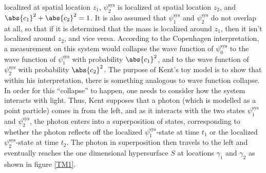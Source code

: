 \documentclass[12pt]{report}
\begin{document}
 localized at spatial location $z_1$, $\psi_2^\text{sys}$ is localized at spatial location $z_2$, and $\abs{c_1}^2+\abs{c_2}^2=1$. It is also assumed that $\psi_1^\text{sys}$ and $\psi_2^\text{sys}$ do not overlap at all, so that if it is determined that the mass is localized around $z_1$, then it isn't localized around $z_2$, and vice versa. According to the Copenhagen interpretation, a measurement on this system would collapse the wave function of $\psi_0^\text{sys}$ to the wave function of $\psi_1^\text{sys}$ with probability $\abs{c_1}^2$, and to the wave function of $\psi_2^\text{sys}$ with probability $\abs{c_2}^2$. The purpose of Kent's toy model is to show that within his interpretation, there is something analogous to wave function collapse.  In order for this ``collapse'' to happen, one needs to consider how the system interacts with light. Thus, Kent supposes that a photon (which is modelled as a point particle) comes in from the left, and as it interacts with the two states $\psi_1^\text{sys}$ and $\psi_2^\text{sys}$, the photon enters into a superposition of states, corresponding to whether the photon reflects off the localized $\psi_1^\text{sys}$-state at time $t_1$ or the localized $\psi_2^\text{sys}$-state at time $t_2$. The photon in superposition then travels to the left and eventually reaches the one dimensional hypersurface $S$ at locations $\gamma_1$ and $\gamma_2$ as shown in figure  \ref{TM1}.
\end{document}
